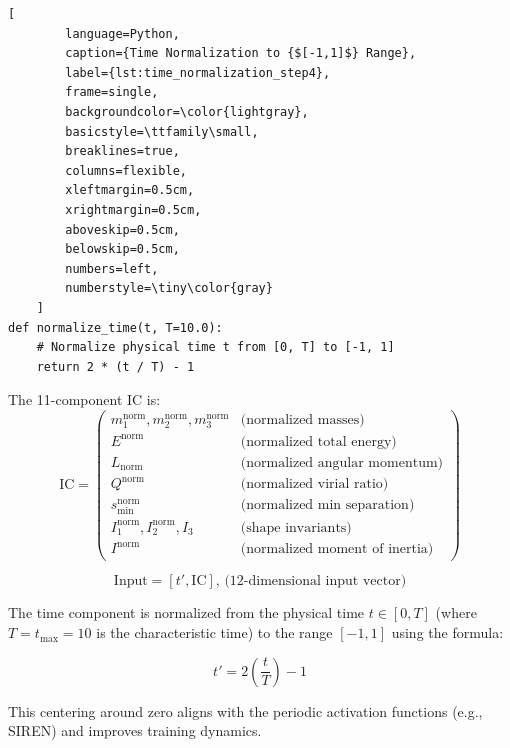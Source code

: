 \begin{enumerate}
    \begin{lstlisting}[
        language=Python,
        caption={Time Normalization to {$[-1,1]$} Range},
        label={lst:time_normalization_step4},
        frame=single,
        backgroundcolor=\color{lightgray},
        basicstyle=\ttfamily\small,
        breaklines=true,
        columns=flexible,
        xleftmargin=0.5cm,
        xrightmargin=0.5cm,
        aboveskip=0.5cm,
        belowskip=0.5cm,
        numbers=left,
        numberstyle=\tiny\color{gray}
    ]
def normalize_time(t, T=10.0):
    # Normalize physical time t from [0, T] to [-1, 1]
    return 2 * (t / T) - 1
    \end{lstlisting}

    The 11-component IC is:
    \begin{equation}
    \text{IC} = \begin{pmatrix}
    m_1^{\text{norm}}, m_2^{\text{norm}}, m_3^{\text{norm}} & \text{(normalized masses)} \\
    E^{\text{norm}} & \text{(normalized total energy)} \\
    L_{\text{norm}} & \text{(normalized angular momentum)} \\
    Q^{\text{norm}} & \text{(normalized virial ratio)} \\
    s_{\min}^{\text{norm}} & \text{(normalized min separation)} \\
    I_1^{\text{norm}}, I_2^{\text{norm}}, I_3 & \text{(shape invariants)} \\
    I^{\text{norm}} & \text{(normalized moment of inertia)}
    \end{pmatrix}
    \end{equation}
\end{enumerate}

    \begin{equation}
        \text{Input} = [t', \text{IC}] \text{, (12-dimensional input vector)}
    \end{equation}

    The time component is normalized from the physical time $t \in [0, T]$ (where $T = t_{\max} = 10$ is the characteristic time) to the range $[-1, 1]$ using the formula:

    \begin{equation}
    t' = 2 \left( \frac{t}{T} \right) - 1
    \end{equation}

    This centering around zero aligns with the periodic activation functions (e.g., SIREN) and improves training dynamics.



